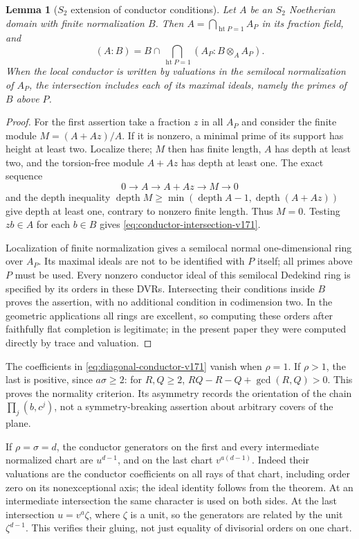 \documentclass[11pt,reqno]{amsart}
\numberwithin{equation}{section}
\newtheorem{lemma}[theorem]{Lemma}
\theoremstyle{definition}\newtheorem{definition}[theorem]{Definition}
\theoremstyle{remark}\newtheorem{remark}[theorem]{Remark}
\begin{document}
\begin{lemma}[$S_2$ extension of conductor conditions]
\label{lem:conductor-depth-v171}
Let $A$ be an $S_2$ Noetherian domain with finite normalization $B$.
Then $A=\bigcap_{\operatorname{ht}P=1}A_P$ in its fraction field, and
\begin{equation}\label{eq:conductor-intersection-v171}
 (A:B)=B\cap\bigcap_{\operatorname{ht}P=1}
             (A_P:B\otimes_A A_P).
\end{equation}
When the local conductor is written by valuations in the semilocal
normalization of $A_P$, the intersection includes each of its maximal
ideals, namely the primes of $B$ above $P$.
\end{lemma}
\begin{proof}
For the first assertion take a fraction $z$ in all $A_P$ and consider
the finite module $M=(A+Az)/A$. If it is nonzero, a minimal prime of
its support has height at least two. Localize there; $M$ then has
finite length, $A$ has depth at least two, and the torsion-free
module $A+Az$ has depth at least one. The exact sequence
\[
 0\longrightarrow A\longrightarrow A+Az\longrightarrow M
 \longrightarrow0
\]
and the depth inequality
$\operatorname{depth}M\geq\min(\operatorname{depth}A-1,
\operatorname{depth}(A+Az))$ give depth at least one, contrary to
nonzero finite length. Thus $M=0$. Testing $zb\in A$ for each $b\in B$
gives \eqref{eq:conductor-intersection-v171}.

Localization of finite normalization gives a semilocal normal
one-dimensional ring over $A_P$. Its maximal ideals are not to be
identified with $P$ itself; all primes above $P$ must be used.
Every nonzero conductor ideal of this semilocal Dedekind ring is
specified by its orders in these DVRs. Intersecting their conditions
inside $B$ proves the assertion, with no additional condition in
codimension two. In the geometric applications all rings are excellent,
so computing these orders after faithfully flat completion is legitimate;
in the present paper they were computed directly by trace and valuation.
\end{proof}

The coefficients in \eqref{eq:diagonal-conductor-v171} vanish when
$\rho=1$. If $\rho>1$, the last is positive, since $a\sigma\geq2$:
for $R,Q\geq2$, $RQ-R-Q+\gcd(R,Q)>0$. This proves the normality
criterion. Its asymmetry records the orientation of the chain
$\prod_j(b,c^j)$, not a symmetry-breaking assertion about arbitrary
covers of the plane.

If $\rho=\sigma=d$, the conductor generators on the first and every
intermediate normalized chart are $u^{d-1}$, and on the last chart
$v^{a(d-1)}$. Indeed their valuations are the conductor coefficients
on all rays of that chart, including order zero on its nonexceptional
axis; the ideal identity follows from the theorem. At an intermediate
intersection the same character is used on both sides. At the last
intersection $u=v^a\zeta$, where $\zeta$ is a unit, so the generators
are related by the unit $\zeta^{d-1}$. This verifies their gluing,
not just equality of divisorial orders on one chart.
\end{document}
